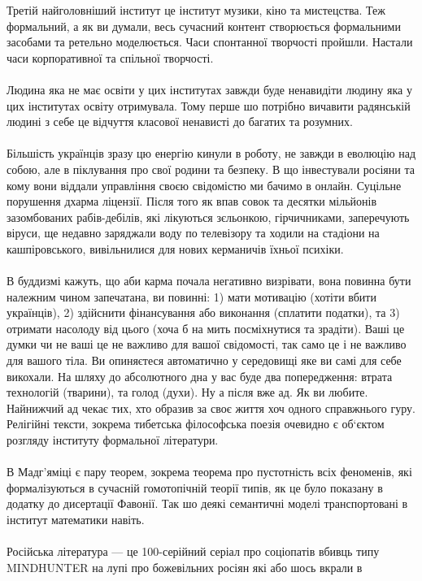 Третій найголовніший інститут це інститут музики, кіно та мистецства. Теж формальний,
а як ви думали, весь сучасний контент створюється формальними засобами та ретельно
моделюється. Часи спонтанної творчості пройшли. Настали часи корпоративної та спільної творчості.
\\
\\
Людина яка не має освіти у цих інститутах завжди буде ненавидіти людину яка у цих
інститутах освіту отримувала. Тому перше шо потрібно вичавити радянській людині з
себе це відчуття класової ненависті до багатих та розумних.
\\
\\
Більшість українців зразу цю енергію кинули в роботу, не завжди в еволюцію над собою,
але в піклування про свої родини та безпеку. В що інвестували росіяни та кому вони
віддали управління своєю свідомістю ми бачимо в онлайн. Суцільне порушення дхарма
ліцензії. Після того як впав совок та десятки мільйонів зазомбованих рабів-дебілів,
які лікуються зєльонкою, гірчичниками, заперечують віруси, ще недавно заряджали воду
по телевізору та ходили на стадіони на кашпіровського, вивільнилися для нових керманичів їхньої психіки.
\\
\\
В буддизмі кажуть, що аби карма почала негативно визрівати, вона повинна бути
належним чином запечатана, ви повинні:
1) мати мотивацію (хотіти вбити українців),
2) здійснити фінансування або виконання (сплатити податки), та
3) отримати насолоду від цього (хоча б на мить посміхнутися та зрадіти).
Ваші це думки чи не ваші це не важливо для вашої свідомості, так само це
і не важливо для вашого тіла. Ви опиняєтеся автоматично у середовищі яке
ви самі для себе викохали. На шляху до абсолютного дна у вас буде два
попередження: втрата технологій (тварини), та голод (духи). Ну а після вже ад.
Як ви любите. Найнижчий ад чекає тих, хто образив за своє життя хоч одного
справжнього гуру. Релігійні тексти, зокрема тибетська філософська поезія
очевидно є об‘єктом розгляду інституту формальної літератури.
\\
\\
В Мадг'яміці є пару теорем, зокрема теорема про пустотність всіх феноменів,
які формалізуються в сучасній гомотопічній теорії типів, як це було показану
в додатку до дисертації Фавонії. Так шо деякі семантичні моделі транспортовані
в інститут математики навіть.
\\
\\
Російська література — це 100-серійний серіал про соціопатів вбивць
типу MINDHUNTER на лупі про божевільних росіян які або шось вкрали в
